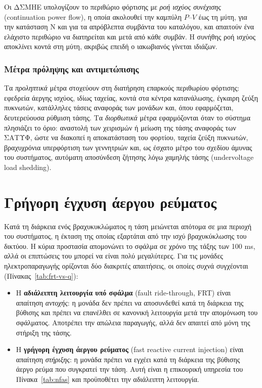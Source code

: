 Οι ΔΣΜΗΕ υπολογίζουν το περιθώριο φόρτισης με \emph{ροή ισχύος συνέχισης} (continuation
power flow), η οποία ακολουθεί την καμπύλη $P$--$V$ έως τη μύτη, για την κατάσταση N και για τα
απρόβλεπτα συμβάντα του καταλόγου, και απαιτούν ένα ελάχιστο περιθώριο να διατηρείται και μετά
από κάθε συμβάν. Η συνήθης ροή ισχύος αποκλίνει κοντά στη μύτη, ακριβώς επειδή ο ιακωβιανός
γίνεται ιδιάζων.

\subsubsection{Μέτρα πρόληψης και αντιμετώπισης}

Τα \emph{προληπτικά} μέτρα στοχεύουν στη διατήρηση επαρκούς περιθωρίου φόρτισης: εφεδρεία
άεργης ισχύος, ιδίως ταχείας, κοντά στα κέντρα κατανάλωσης, έγκαιρη ζεύξη πυκνωτών, κατάλληλες
τάσεις αναφοράς των μονάδων και, όπου εφαρμόζεται, δευτερεύουσα ρύθμιση τάσης. Τα
\emph{διορθωτικά} μέτρα εφαρμόζονται όταν το σύστημα πλησιάζει το όριο: αναστολή των χειρισμών
ή μείωση της τάσης αναφοράς των ΣΑΤΥΦ, ώστε να διακοπεί η αποκατάσταση του
φορτίου, ταχεία ζεύξη πυκνωτών, βραχυχρόνια υπερφόρτιση των γεννητριών και, ως έσχατο μέτρο του
σχεδίου άμυνας του συστήματος, αυτόματη αποσύνδεση ζήτησης λόγω χαμηλής τάσης (undervoltage
load shedding).

\section{Γρήγορη έγχυση άεργου ρεύματος}
\label{sec:frt}

Κατά τη διάρκεια ενός βραχυκυκλώματος η τάση μειώνεται απότομα σε μια περιοχή του συστήματος,
η έκταση της οποίας εξαρτάται από την ισχύ βραχυκύκλωσης του δικτύου. Η κύρια προστασία
απομονώνει το σφάλμα σε χρόνο της τάξης των 100 ms, αλλά οι επιπτώσεις του μπορεί να είναι
πολύ μεγαλύτερες. Για τις μονάδες ηλεκτροπαραγωγής ορίζονται δύο διακριτές απαιτήσεις, οι
οποίες συχνά συγχέονται (Πίνακας~\ref{tab:frt-vs-q}):

\begin{itemize}
\item Η \textbf{αδιάλειπτη λειτουργία υπό σφάλμα} (fault ride-through, FRT) είναι
      απαίτηση \emph{αντοχής}: η μονάδα δεν πρέπει να αποσυνδεθεί κατά τη διάρκεια της
      βύθισης και πρέπει να επανέλθει σε κανονική λειτουργία μετά την απομόνωση του σφάλματος.
      Αποτρέπει την απώλεια παραγωγής, αλλά δεν απαιτεί από μόνη της στήριξη της τάσης.
\item Η \textbf{γρήγορη έγχυση άεργου ρεύματος} (fast reactive current injection) είναι
      απαίτηση \emph{στήριξης}: η μονάδα πρέπει να εγχέει κατά τη διάρκεια της βύθισης άεργο
      ρεύμα που συγκρατεί την τάση. Αυτή είναι η επικουρική υπηρεσία του
      Πίνακα~\ref{tab:nfas} και προϋποθέτει την αδιάλειπτη λειτουργία.
\end{itemize}

